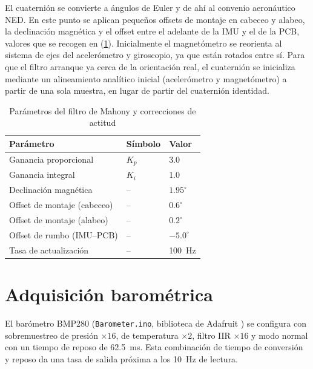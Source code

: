 El cuaternión se convierte a ángulos de Euler y de ahí al convenio aeronáutico
NED. En este punto se aplican pequeños offsets de montaje en cabeceo y alabeo, la declinación magnética y el offset entre el adelante de la IMU y el de la PCB, valores que se recogen en (\cref{tab:mahony_params}). Inicialmente el magnetómetro se reorienta al sistema de ejes del acelerómetro y giroscopio, ya que están rotados entre sí. Para que el filtro arranque ya cerca de la orientación real,
el cuaternión se inicializa mediante un alineamiento analítico inicial (acelerómetro y magnetómetro) a partir de una sola muestra, en lugar de partir del cuaternión identidad.

\begin{table}[H]
    \centering
    \caption{Parámetros del filtro de Mahony y correcciones de actitud}
    \label{tab:mahony_params}
    \begin{tabularx}{\linewidth}{X l l}
        \toprule
        \textbf{Parámetro} & \textbf{Símbolo} & \textbf{Valor} \\
        \midrule
        Ganancia proporcional  & $K_p$ & \num{3.0} \\
        Ganancia integral      & $K_i$ & \num{1.0} \\
        Declinación magnética  & --    & $1.95^{\circ}$ \\
        Offset de montaje (cabeceo) & -- & $0.6^{\circ}$ \\
        Offset de montaje (alabeo)  & -- & $0.2^{\circ}$ \\
        Offset de rumbo (IMU--PCB)  & -- & $-5.0^{\circ}$ \\
        Tasa de actualización  & --    & \SI{100}{\hertz} \\
        \bottomrule
    \end{tabularx}
\end{table}


\section{Adquisición barométrica}
\label{sec:fw_baro}

El barómetro BMP280 (\texttt{Barometer.ino}, biblioteca de Adafruit
\cite{lib_bmp280}) se configura con sobremuestreo de presión $\times 16$, de
temperatura $\times 2$, filtro IIR $\times 16$ y modo normal con un tiempo de
reposo de \SI{62.5}{\milli\second}. Esta combinación de tiempo de conversión y
reposo da una tasa de salida próxima a los \SI{10}{\hertz} de lectura.

